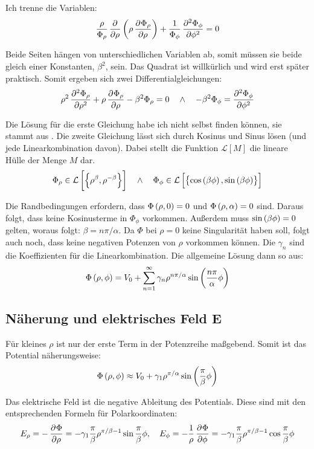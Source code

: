 \documentclass[11pt, ngerman, fleqn]{article}
\renewcommand{\vec}[1]{\boldsymbol{#1}}
\begin{document}
Ich trenne die Variablen:
\[
	\frac \rho{ \Phi_\rho } \dpd{}\rho \del{\rho \dpd{\Phi_\rho}\rho} +  \frac
	1{ \Phi_\phi } \dpd[2]{\Phi_\phi}\phi  = 0
\]

Beide Seiten hängen von unterschiedlichen Variablen ab, somit müssen sie beide
gleich einer Konstanten, $\beta^2$, sein. Das Quadrat ist willkürlich und wird
erst später praktisch. Somit ergeben sich zwei Differentialgleichungen:
\[
	\rho^2 \dpd[2]{\Phi_\rho}\rho + \rho \dpd{\Phi_\rho}\rho - \beta^2 \Phi_\rho = 0
	\quad\wedge\quad
	-\beta^2 \Phi_\phi = \dpd[2]{\Phi_\phi}\phi
\]

Die Lösung für die erste Gleichung habe ich nicht selbst finden können, sie
stammt aus \cite[Seite~92]{jackson-klassische_elektrodynamik}. Die zweite
Gleichung lässt sich durch Kosinus und Sinus lösen (und jede Linearkombination
davon). Dabei stellt die Funktion $\mathcal L[M]$ die lineare Hülle der Menge
$M$ dar.
\[
	\Phi_\rho \in \mathcal L \sbr{\set{\rho^\beta, \rho^{-\beta}}}
	\quad\wedge\quad
	\Phi_\phi \in \mathcal L \sbr{\set{\cos\del{\beta \phi}, \sin\del{\beta \phi}}}
\]

Die Randbedingungen erfordern, dass $\Phi\del{\rho, 0} = 0$ und $\Phi\del{\rho,
\alpha} = 0$ sind. Daraus folgt, dass keine Kosinusterme in $\Phi_\phi$
vorkommen. Außerdem muss $\sin\del{\beta \phi} = 0$ gelten, woraus folgt:
$\beta = n \pi / \alpha$. Da $\Phi$ bei $\rho = 0$ keine Singularität haben
soll, folgt auch noch, dass keine negativen Potenzen von $\rho$ vorkommen
können. Die $\gamma_n$ sind die Koeffizienten für die Linearkombination. Die
allgemeine Lösung dann so aus:
\[
	\Phi\del{\rho, \phi} = V_0 + \sum_{n = 1}^\infty \gamma_n \rho^{n \pi /
	\alpha} \sin\del{\frac{n\pi}{\alpha} \phi}
\]

\subsection{Näherung und elektrisches Feld $\vec E$}

Für kleines $\rho$ ist nur der erste Term in der Potenzreihe maßgebend. Somit ist das Potential näherungs\-weise:
\[
	\Phi\del{\rho, \phi} \approx V_0 + \gamma_1 \rho^{\pi/\alpha} \sin\del{\frac\pi\beta\phi}
\]

Das elektrische Feld ist die negative Ableitung des Potentials. Diese sind mit den entsprechenden Formeln für Polarkoordinaten:
\[
	E_\rho = - \dpd\Phi\rho = - \gamma_1 \frac\pi\beta \rho^{\pi/\beta - 1} \sin{\frac\pi\beta\phi}
	, \quad
	E_\phi = - \frac 1\rho \dpd\Phi\phi = - \gamma_1 \frac\pi\beta \rho^{\pi/\beta - 1} \cos{\frac\pi\beta\phi}
\]
\end{document}
